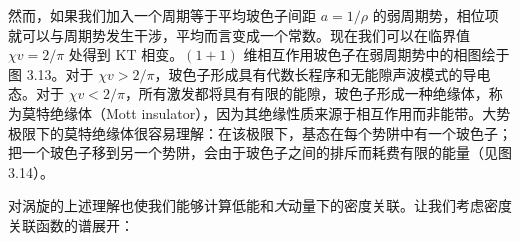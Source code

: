 然而，如果我们加入一个周期等于平均玻色子间距 $a = 1/\rho$ 的弱周期势，相位项就可以与周期势发生干涉，平均而言变成一个常数。现在我们可以在临界值 $\chi v = 2/\pi$ 处得到 KT 相变。$(1+1)$ 维相互作用玻色子在弱周期势中的相图绘于图 3.13。对于 $\chi v > 2/\pi$，玻色子形成具有代数长程序和无能隙声波模式的导电态。对于 $\chi v < 2/\pi$，所有激发都将具有有限的能隙，玻色子形成一种绝缘体，称为莫特绝缘体（Mott insulator），因为其绝缘性质来源于相互作用而非能带。大势极限下的莫特绝缘体很容易理解：在该极限下，基态在每个势阱中有一个玻色子；把一个玻色子移到另一个势阱，会由于玻色子之间的排斥而耗费有限的能量（见图 3.14）。



对涡旋的上述理解也使我们能够计算低能和\emph{大}动量下的密度关联。让我们考虑密度关联函数的谱展开：

